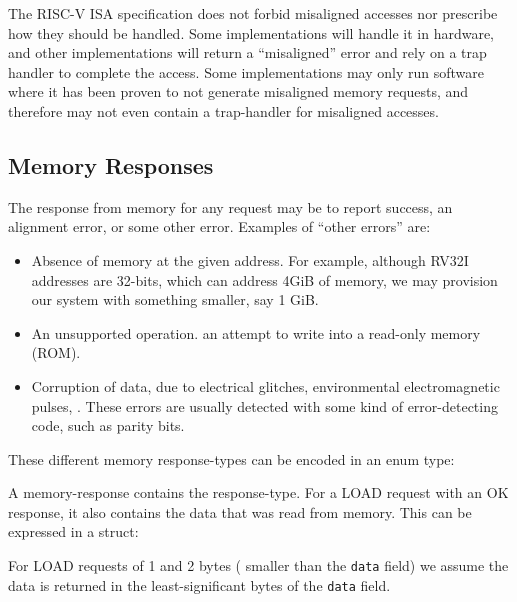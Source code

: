 The RISC-V ISA specification does not forbid misaligned accesses nor
prescribe how they should be handled.  Some implementations will
handle it in hardware, and other implementations will return a
``misaligned'' error and rely on a trap handler to complete the
access.  Some implementations may only run software where it has been
proven to not generate misaligned memory requests, and therefore may
not even contain a trap-handler for misaligned accesses.




\subsection{Memory Responses}

\label{Sec_Mem_Rsp}


The response from memory for any request may be to report success, an
alignment error, or some other error.  Examples of ``other errors''
are:

\begin{itemize}

\item Absence of memory at the given address.  For example, although
  RV32I addresses are 32-bits, which can address 4GiB of memory, we
  may provision our system with something smaller, say 1 GiB.

\item An unsupported operation. {\Eg} an attempt to write into a
  read-only memory (ROM).

\item Corruption of data, due to electrical glitches, environmental
  electromagnetic pulses, {\etc}.  These errors are usually detected
  with some kind of error-detecting code, such as parity bits.

\end{itemize}

These different memory response-types can be encoded in an enum type:


A memory-response contains the response-type. For a LOAD request with
an OK response, it also contains the data that was read from memory.
This can be expressed in a struct:


For LOAD requests of 1 and 2 bytes ({\ie} smaller than the \verb|data|
field) we assume the data is returned in the least-significant bytes
of the \verb|data| field.



